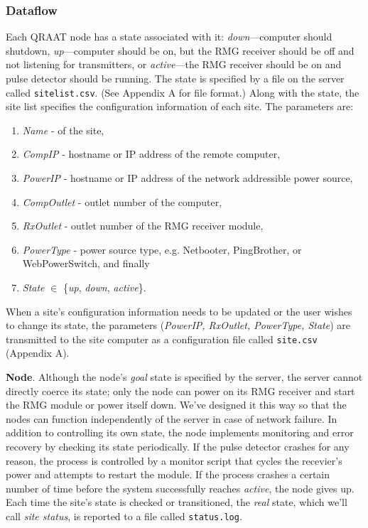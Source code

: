 \documentclass[letter]{article}
\begin{document}
\subsubsection{Dataflow}
Each QRAAT node has a state associated with it: \textit{down}---computer should shutdown,
\textit{up}---computer should be on, but the RMG receiver should be off and not listening 
for transmitters, or \textit{active}---the RMG receiver should be on and pulse detector should
be running. The state is specified by a file on the server called \texttt{sitelist.csv}.
(See Appendix A for file format.) Along with the state, the site list specifies the 
configuration information of each site. The parameters are:
\begin{enumerate}
  \item \textit{Name} - of the site, 
  \item \textit{CompIP} - hostname or IP address of the remote computer, 
  \item \textit{PowerIP} - hostname or IP address of the network addressible power source,
  \item \textit{CompOutlet} - outlet number of the computer, 
  \item \textit{RxOutlet} - outlet number of the RMG receiver module, 
  \item \textit{PowerType} - power source type, e.g. Netbooter, PingBrother, or WebPowerSwitch, and finally
  \item \textit{State} $\in$ \{\textit{up}, \textit{down}, \textit{active}\}.
\end{enumerate}

When a site's configuration information needs to be updated or the user wishes to change 
its state, the parameters (\textit{PowerIP, RxOutlet, PowerType, State}) are transmitted to the
site computer as a configuration file called \texttt{site.csv} (Appendix A). 

\textbf{Node}. Although the node's \textit{goal} state is specified by the server, the server
cannot directly coerce its state; only the node can power on its RMG receiver and start the RMG
module or power itself down. We've designed it this way so that the nodes can function independently
of the server in case of network failure. In addition to controlling its own state, the node 
implements monitoring and error recovery by checking its state periodically. If the pulse detector
crashes for any reason, the process is controlled by a monitor script that cycles the recevier's 
power and attempts to restart the module. If the process crashes a certain number of time before 
the system successfully reaches \textit{active}, the node gives up. Each time the site's state is 
checked or transitioned, the \textit{real} state, which we'll call \textit{site status}, is 
reported to a file called \texttt{status.log}. 
\end{document}
